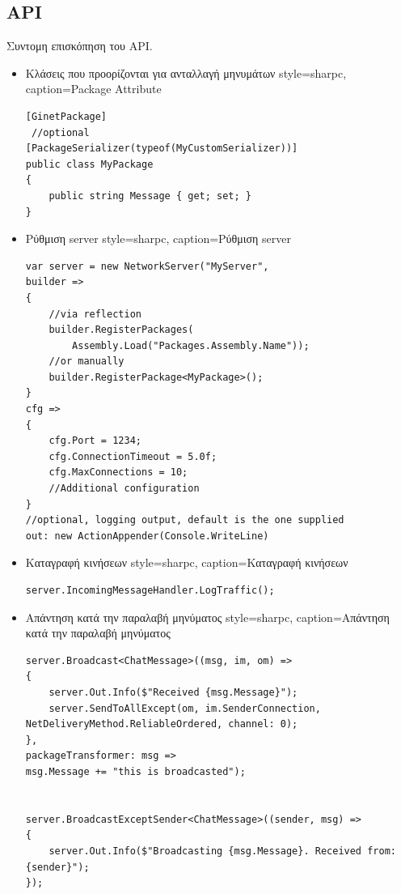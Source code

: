 	\subsection{API}
	Συντομη επισκόπηση του API.
	\begin{itemize}
		\item Κλάσεις που προορίζονται για ανταλλαγή μηνυμάτων
	\lstset
	{
		style=sharpc, 
		caption={Package Attribute}
	}
		\begin{lstlisting}
[GinetPackage]
 //optional
[PackageSerializer(typeof(MyCustomSerializer))]
public class MyPackage
{
    public string Message { get; set; }
}          
		\end{lstlisting}
		\item Ρύθμιση server
	\lstset
	{
		style=sharpc, 
		caption={Ρύθμιση server}
	}
		\begin{lstlisting}     
var server = new NetworkServer("MyServer",
builder =>
{
	//via reflection
	builder.RegisterPackages(
		Assembly.Load("Packages.Assembly.Name"));
	//or manually
	builder.RegisterPackage<MyPackage>();
}
cfg =>
{
	cfg.Port = 1234;
	cfg.ConnectionTimeout = 5.0f;
	cfg.MaxConnections = 10;
	//Additional configuration
}
//optional, logging output, default is the one supplied			 
out: new ActionAppender(Console.WriteLine) 
		\end{lstlisting}
		\item Καταγραφή κινήσεων		
	\lstset
	{
		style=sharpc, 
		caption={Καταγραφή κινήσεων}
	}
		\begin{lstlisting}
server.IncomingMessageHandler.LogTraffic();
		\end{lstlisting}		
		\item Απάντηση κατά την παραλαβή μηνύματος
	\lstset
	{
		style=sharpc, 
		caption={Απάντηση κατά την παραλαβή μηνύματος}
	}
		\begin{lstlisting}
server.Broadcast<ChatMessage>((msg, im, om) =>
{
	server.Out.Info($"Received {msg.Message}");
	server.SendToAllExcept(om, im.SenderConnection, NetDeliveryMethod.ReliableOrdered, channel: 0);
}, 
packageTransformer: msg => 
msg.Message += "this is broadcasted");	


server.BroadcastExceptSender<ChatMessage>((sender, msg) =>
{
	server.Out.Info($"Broadcasting {msg.Message}. Received from: {sender}");
});
		\end{lstlisting} 		


\end{itemize}
